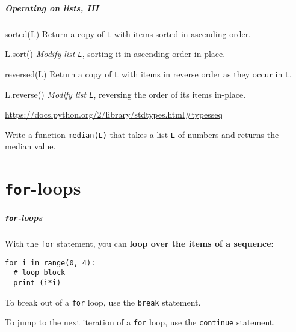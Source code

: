 \documentclass[english,serif,mathserif,xcolor=pdftex,dvipsnames,table]{beamer}
\begin{document}
\begin{frame}[fragile]
  \frametitle{Operating on lists, III}

  \begin{describe}{sorted(L)}
    Return a copy of \texttt{L} with items sorted in ascending order.
  \end{describe}

  \begin{describe}{L.sort()}
    \emph{Modify list \texttt{L}}, sorting it in ascending order in-place.
  \end{describe}

  \begin{describe}{reversed(L)}
    Return a copy of \texttt{L} with items in reverse order as they occur in \texttt{L}.
  \end{describe}

  \begin{describe}{L.reverse()}
    \emph{Modify list \texttt{L}}, reversing the order of its items in-place.
  \end{describe}

  \begin{references}
    \url{https://docs.python.org/2/library/stdtypes.html#typesseq}
  \end{references}
\end{frame}


\begin{frame}
  \begin{exercise*}[3.B]
    Write a function \texttt{median(L)} that takes a list \texttt{L}
    of numbers and returns the median value.
  \end{exercise*}
\end{frame}


\part{\texttt{for}-loops}
\begin{frame}[fragile]
  \frametitle{\texttt{for}-loops}
    With the  \texttt{for} statement, you can \textbf{loop over the items of
    a sequence}:
\begin{lstlisting}
for i in range(0, 4):
  # loop block
  print (i*i)
\end{lstlisting}

  \+
  To break out of a \texttt{for} loop, use the \texttt{break}
  statement.

  \+
  To jump to the next iteration of a \texttt{for} loop, use the
  \texttt{continue} statement.
\end{frame}
\end{document}
